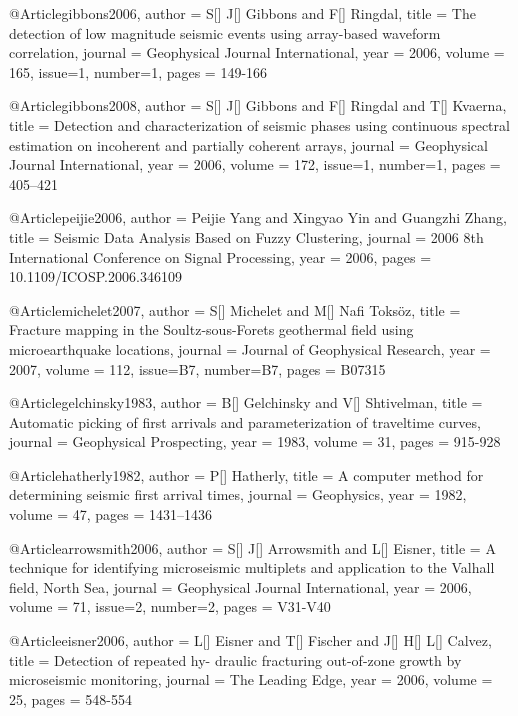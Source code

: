   @Article{gibbons2006,
  author = 	 {S[] J[] Gibbons and F[] Ringdal},
  title = 	 {The detection of low magnitude seismic events using array-based waveform correlation},
  journal = 	 {Geophysical Journal International},
  year = 	 2006,
  volume = 	 165,
  issue=1,
  number=1,
  pages = 	 {149-166}}
  
   @Article{gibbons2008,
  author = 	 {S[] J[] Gibbons and F[] Ringdal and T[] Kvaerna},
  title = 	 {Detection and characterization of seismic phases using continuous spectral estimation on incoherent and partially coherent arrays},
  journal = 	 {Geophysical Journal International},
  year = 	 2006,
  volume = 	 172,
  issue=1,
  number=1,
  pages = 	 {405–421}} 
  
   @Article{peijie2006,
  author = 	 {Peijie Yang and Xingyao Yin and Guangzhi Zhang},
  title = 	 {Seismic Data Analysis Based on Fuzzy Clustering},
  journal = 	 {2006 8th International Conference on Signal Processing},
  year = 	 2006,
  pages = 	 {10.1109/ICOSP.2006.346109}} 

    @Article{michelet2007,
  author = 	 {S[] Michelet and M[] Nafi Toks\"{o}z},
  title = 	 {Fracture mapping in the Soultz-sous-Forets geothermal field using microearthquake locations},
  journal = 	 {Journal of Geophysical Research},
  year = 	 2007,
  volume = 	 112,
  issue=B7,
  number=B7,
  pages = 	 {B07315}} 
 
    @Article{gelchinsky1983,
  author = 	 {B[] Gelchinsky and V[] Shtivelman},
  title = 	 {Automatic picking of first arrivals and parameterization of traveltime curves},
  journal = 	 {Geophysical Prospecting},
  year = 	 1983,
  volume = 	 31,
  pages = 	 {915-928}} 

  @Article{hatherly1982,
  author = 	 {P[] Hatherly},
  title = 	 {A computer method for determining seismic first arrival times},
  journal = 	 {Geophysics},
  year = 	 1982,
  volume = 	 47,
  pages = 	 {1431–1436}} 
    
   @Article{arrowsmith2006,
  author = 	 {S[] J[] Arrowsmith and L[] Eisner},
  title = 	 {A technique for identifying microseismic multiplets and application to the Valhall field, North Sea},
  journal = 	 {Geophysical Journal International},
  year = 	 2006,
  volume = 	 71,
  issue=2,
  number=2,
  pages = 	 {V31-V40}} 
  
    @Article{eisner2006,
  author = 	 {L[] Eisner and T[] Fischer and J[] H[] L[] Calvez},
  title = 	 {Detection of repeated hy- draulic fracturing  out-of-zone growth  by microseismic monitoring},
  journal = 	 {The Leading Edge},
  year = 	 2006,
  volume = 	 25,
  pages = 	 {548-554}}
  
